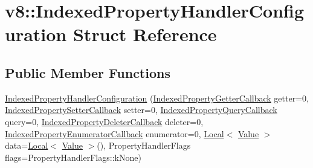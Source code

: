 \hypertarget{structv8_1_1_indexed_property_handler_configuration}{}\section{v8\+:\+:Indexed\+Property\+Handler\+Configuration Struct Reference}
\label{structv8_1_1_indexed_property_handler_configuration}
\subsection*{Public Member Functions}
\begin{DoxyCompactItemize}
\item 
\hyperlink{structv8_1_1_indexed_property_handler_configuration_a1e474ac223c5b502e6eab8b0336f9fe7}{Indexed\+Property\+Handler\+Configuration} (\hyperlink{namespacev8_a48e7816ba64447bf32a25d194588daaf}{Indexed\+Property\+Getter\+Callback} getter=0, \hyperlink{namespacev8_a4ac7cc6185ebc8b6a199f9fa8e6bf5c3}{Indexed\+Property\+Setter\+Callback} setter=0, \hyperlink{namespacev8_a980b62c33eb664783e61e25c3b27f9ee}{Indexed\+Property\+Query\+Callback} query=0, \hyperlink{namespacev8_a53863728de14cde48dd6543207b2f2da}{Indexed\+Property\+Deleter\+Callback} deleter=0, \hyperlink{namespacev8_adbb0a6d5537371953f9ba807d4f6275e}{Indexed\+Property\+Enumerator\+Callback} enumerator=0, \hyperlink{classv8_1_1_local}{Local}$<$ \hyperlink{classv8_1_1_value}{Value} $>$ data=\hyperlink{classv8_1_1_local}{Local}$<$ \hyperlink{classv8_1_1_value}{Value} $>$(), Property\+Handler\+Flags flags=Property\+Handler\+Flags\+::k\+None)
\end{DoxyCompactItemize}
